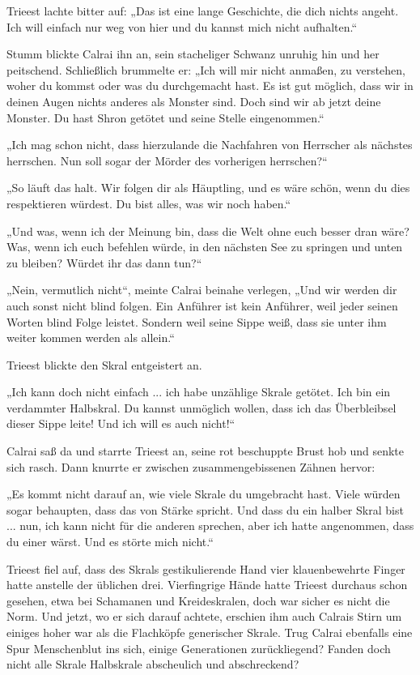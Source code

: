 Trieest lachte bitter auf: „Das ist eine lange Geschichte, die dich nichts angeht. Ich will einfach nur weg von hier und du kannst mich nicht aufhalten.“

Stumm blickte Calrai ihn an, sein stacheliger Schwanz unruhig hin und her peitschend. Schließlich brummelte er: „Ich will mir nicht anmaßen, zu verstehen, woher du kommst oder was du durchgemacht hast. Es ist gut möglich, dass wir in deinen Augen nichts anderes als Monster sind. Doch sind wir ab jetzt deine Monster. Du hast Shron getötet und seine Stelle eingenommen.“

„Ich mag schon nicht, dass hierzulande die Nachfahren von Herrscher als nächstes herrschen. Nun soll sogar der Mörder des vorherigen herrschen?“

„So läuft das halt. Wir folgen dir als Häuptling, und es wäre schön, wenn du dies respektieren würdest. Du bist alles, was wir noch haben.“

„Und was, wenn ich der Meinung bin, dass die Welt ohne euch besser dran wäre? Was, wenn ich euch befehlen würde, in den nächsten See zu springen und unten zu bleiben? Würdet ihr das dann tun?“

„Nein, vermutlich nicht“, meinte Calrai beinahe verlegen, „Und wir werden dir auch sonst nicht blind folgen. Ein Anführer ist kein Anführer, weil jeder seinen Worten blind Folge leistet. Sondern weil seine Sippe weiß, dass sie unter ihm weiter kommen werden als allein.“

Trieest blickte den Skral entgeistert an.

„Ich kann doch nicht einfach ... ich habe unzählige Skrale getötet. Ich bin ein verdammter Halbskral. Du kannst unmöglich wollen, dass ich das Überbleibsel dieser Sippe leite! Und ich will es auch nicht!“

Calrai saß da und starrte Trieest an, seine rot beschuppte Brust hob und senkte sich rasch. Dann knurrte er zwischen zusammengebissenen Zähnen hervor:

„Es kommt nicht darauf an, wie viele Skrale du umgebracht hast. Viele würden sogar behaupten, dass das von Stärke spricht. Und dass du ein halber Skral bist ... nun, ich kann nicht für die anderen sprechen, aber ich hatte angenommen, dass du einer wärst. Und es störte mich nicht.“

Trieest fiel auf, dass des Skrals gestikulierende Hand vier klauenbewehrte Finger hatte anstelle der üblichen drei. Vierfingrige Hände hatte Trieest durchaus schon gesehen, etwa bei Schamanen und Kreideskralen, doch war sicher es nicht die Norm. Und jetzt, wo er sich darauf achtete, erschien ihm auch Calrais Stirn um einiges hoher war als die Flachköpfe generischer Skrale. Trug Calrai ebenfalls eine Spur Menschenblut ins sich, einige Generationen zurückliegend? Fanden doch nicht alle Skrale Halbskrale abscheulich und abschreckend?


